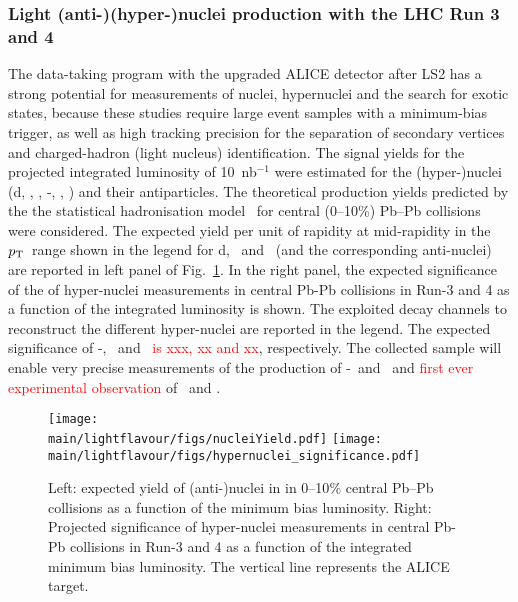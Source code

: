 \subsubsection{Light (anti-)(hyper-)nuclei production with the LHC Run 3 and 4}
The data-taking program with the upgraded ALICE detector after LS2 has a strong potential for measurements of nuclei, hypernuclei and the search for exotic states, because these studies require large event samples with a minimum-bias trigger, as well as high tracking precision for the separation of secondary vertices 
and charged-hadron (light nucleus) identification. The signal yields for the projected integrated luminosity of 10~nb$^{-1}$ were estimated for the 
(hyper-)nuclei (d,  \hethree, \hefour, \hyp, \hypfour, \hyphefour) and their antiparticles.
The theoretical production yields predicted by the the statistical hadronisation 
model~\cite{Andronic:2010qu} for central (0--10\%) Pb--Pb collisions 
were considered. 
The expected yield per unit of rapidity at mid-rapidity in the $p_{\rm T}$\ range shown in the legend for d, \hethree\
and \hefour\ (and the corresponding anti-nuclei) are reported in left panel of Fig.~\ref{fig:yieldrun34}. 
In the right panel, the expected significance of the of hyper-nuclei measurements in central Pb-Pb collisions in Run-3 and 4 as a function of the integrated luminosity is shown. The exploited decay channels to reconstruct the different hyper-nuclei are reported in the legend. 
The expected significance 
of \hyp, \hypfour\ and \hyphefour\ \textcolor{red}{is xxx, xx and xx}, respectively. The collected sample will enable 
very precise measurements of the production of \hyp\ and \antihyp\ and \textcolor{red}{first ever experimental observation} of \antihypfour\ and \antihehypfour.

\begin{figure}[h]
\begin{center}
\texttt{[image: \\main/lightflavour/figs/nucleiYield.pdf]}
\texttt{[image: \\main/lightflavour/figs/hypernuclei\_significance.pdf]}
\end{center}
\caption{Left: expected yield of (anti-)nuclei in in 0--10$\%$ central Pb--Pb collisions as a function of the minimum bias luminosity. 
Right: Projected significance of hyper-nuclei measurements in central Pb-Pb collisions in Run-3 and 4 as a function of the integrated minimum bias luminosity. 
The vertical line represents the ALICE target.}
\label{fig:yieldrun34}
\end{figure}

